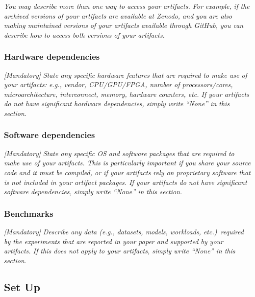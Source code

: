 \documentclass[sigconf]{acmart}
\begin{document}
	\emph{You may describe more than one way to access your artifacts.
		For example, if the archived versions of your artifacts are available
		at Zenodo, and you are also making maintained versions of your
		artifacts available through GitHub, you can describe how to access
		both versions of your artifacts.}
	
	
	\subsubsection{Hardware dependencies}
	
	\emph{[Mandatory]}
	\emph{State any specific hardware features that are required to make
		use of your artifacts: e.g., vendor, CPU/GPU/FPGA, number of
		processors/cores, microarchitecture, interconnect, memory, hardware
		counters, etc.  If your artifacts do not have significant hardware
		dependencies, simply write ``None'' in this section.}
	
	
	\subsubsection{Software dependencies}
	
	\emph{[Mandatory]}
	\emph{State any specific OS and software packages that are required to
		make use of your artifacts.  This is particularly important if you
		share your source code and it must be compiled, or if your artifacts
		rely on proprietary software that is not included in your artifact
		packages.  If your artifacts do not have significant software
		dependencies, simply write ``None'' in this section.}
	
	
	\subsubsection{Benchmarks}
	
	\emph{[Mandatory]}
	\emph{Describe any data (e.g., datasets, models, workloads,
		etc.)\ required by the experiments that are reported in your paper and
		supported by your artifacts.  If this does not apply to your
		artifacts, simply write ``None'' in this section.}
	
	
	\subsection{Set Up}
	
\end{document}

